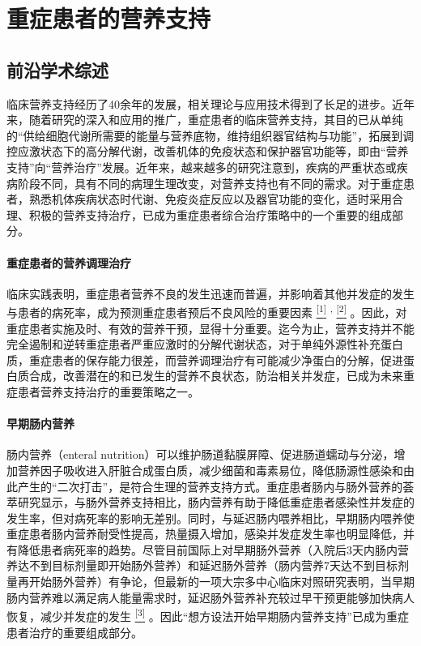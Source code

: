 \chapter{重症患者的营养支持}

\section{前沿学术综述}

临床营养支持经历了40余年的发展，相关理论与应用技术得到了长足的进步。近年来，随着研究的深入和应用的推广，重症患者的临床营养支持，其目的已从单纯的“供给细胞代谢所需要的能量与营养底物，维持组织器官结构与功能”，拓展到调控应激状态下的高分解代谢，改善机体的免疫状态和保护器官功能等，即由“营养支持”向“营养治疗”发展。近年来，越来越多的研究注意到，疾病的严重状态或疾病阶段不同，具有不同的病理生理改变，对营养支持也有不同的需求。对于重症患者，熟悉机体疾病状态时代谢、免疫炎症反应以及器官功能的变化，适时采用合理、积极的营养支持治疗，已成为重症患者综合治疗策略中的一个重要的组成部分。

\subsubsection{重症患者的营养调理治疗}

临床实践表明，重症患者营养不良的发生迅速而普遍，并影响着其他并发症的发生与患者的病死率，成为预测重症患者预后不良风险的重要因素
\protect\hyperlink{text00028.htmlux5cux23ch1-27}{\textsuperscript{{[}1{]}}}
\textsuperscript{,}
\protect\hyperlink{text00028.htmlux5cux23ch2-27}{\textsuperscript{{[}2{]}}}
。因此，对重症患者实施及时、有效的营养干预，显得十分重要。迄今为止，营养支持并不能完全遏制和逆转重症患者严重应激时的分解代谢状态，对于单纯外源性补充蛋白质，重症患者的保存能力很差，而营养调理治疗有可能减少净蛋白的分解，促进蛋白质合成，改善潜在的和已发生的营养不良状态，防治相关并发症，已成为未来重症患者营养支持治疗的重要策略之一。

\subsubsection{早期肠内营养}

肠内营养（enteral
nutrition）可以维护肠道黏膜屏障、促进肠道蠕动与分泌，增加营养因子吸收进入肝脏合成蛋白质，减少细菌和毒素易位，降低肠源性感染和由此产生的“二次打击”，是符合生理的营养支持方式。重症患者肠内与肠外营养的荟萃研究显示，与肠外营养支持相比，肠内营养有助于降低重症患者感染性并发症的发生率，但对病死率的影响无差别。同时，与延迟肠内喂养相比，早期肠内喂养使重症患者肠内营养耐受性提高，热量摄入增加，感染并发症发生率也明显降低，并有降低患者病死率的趋势。尽管目前国际上对早期肠外营养（入院后3天内肠内营养达不到目标剂量即开始肠外营养）和延迟肠外营养（肠内营养7天达不到目标剂量再开始肠外营养）有争论，但最新的一项大宗多中心临床对照研究表明，当早期肠内营养难以满足病人能量需求时，延迟肠外营养补充较过早干预更能够加快病人恢复，减少并发症的发生
\protect\hyperlink{text00028.htmlux5cux23ch3-27}{\textsuperscript{{[}3{]}}}
。因此“想方设法开始早期肠内营养支持”已成为重症患者治疗的重要组成部分。

